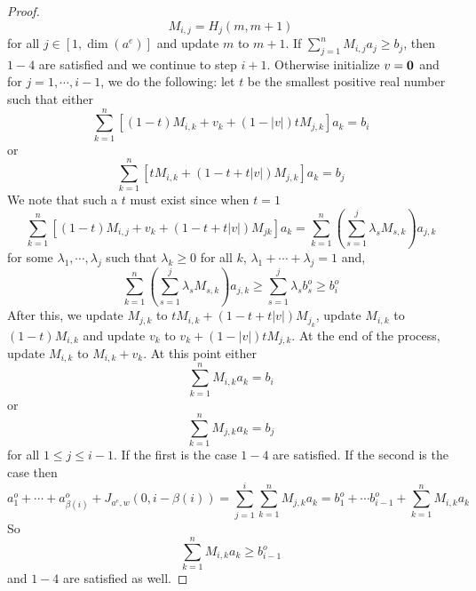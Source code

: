 \documentclass[10pt,a4paper]{amsart}
\begin{document}
\begin{proof}
\[
M_{i, j} = H_j (m, m + 1)
\]
for all $j \in [1, \dim(a^e)]$ and update $m$ to $m + 1$. If $\sum_{j = 1}^n M_{i, j} a_j \geq b_j$, then $1-4$ are satisfied and we continue to step $i + 1$. Otherwise initialize $v = \bf{0}$ and for $j = 1, \cdots, i - 1$, we do the following: let $t$ be the smallest positive real number such that either
\[
\sum_{k = 1}^n [(1 - t) M_{i, k} + v_k + (1 - |v|)t M_{j, k} ] a_k = b_i
\]
or
\[
\sum_{k = 1}^n [ t M_{i, k} + (1 - t + t|v| ) M_{j, k} ] a_k = b_j
\]
We note that such a $t$ must exist since when $t = 1$
\[
\sum_{k = 1}^n [ (1 - t) M_{i, j} + v_k + (1 - t + t|v|) M_{j k} ] a_k = \sum_{k = 1}^n \left ( \sum_{s = 1}^j \lambda_s M_{s, k} \right ) a_{j, k}
\]
for some $\lambda_1, \cdots, \lambda_j$ such that $\lambda_k \geq 0$ for all $k$, $\lambda_1 + \cdots + \lambda_j = 1$ and,
\[
\sum_{k = 1}^n \left ( \sum_{s = 1}^j \lambda_s M_{s, k} \right ) a_{j, k} \geq \sum_{s = 1}^j \lambda_s b^o_s \geq b^o_i
\]
After this, we update $M_{j, k}$ to $t M_{i, k} + (1 - t + t|v|) M_{j_k}$, update $M_{i, k}$ to $(1 - t) M_{i, k}$ and update $v_k$ to $ v_k + (1 - |v|) t M_{j, k}$.
\medskip
At the end of the process, update $M_{i, k}$ to $M_{i, k}+ v_k$. At this point either
\[
\sum_{k = 1}^n M_{i, k} a_k = b_i
\]
or
\[
\sum_{k = 1}^n M_{j, k} a_k = b_j
\]
for all $1 \leq j \leq i - 1$. If the first is the case $1-4$ are satisfied. If the second is the case then
\[
a^o_1 + \cdots + a^o_{\beta(i)} + J_{a^e, w}(0, i - \beta(i) ) = \sum_{j = 1}^i \sum_{k = 1}^n M_{j, k} a_k = b^o_1 + \cdots b^o_{i-1} + \sum_{k = 1}^n M_{i, k} a_k
\]
So
\[
\sum_{k = 1}^n M_{i, k} a_k \geq b^o_{i - 1}
\]
and $1-4$ are satisfied as well.
\end{proof}
\end{document}
